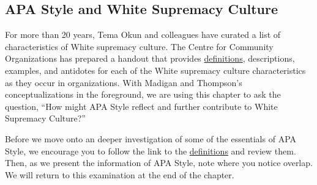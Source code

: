 \documentclass[
  11pt,
]{book}
\begin{document}
\hypertarget{apa-style-and-white-supremacy-culture}{%
\subsection{APA Style and White Supremacy Culture}\label{apa-style-and-white-supremacy-culture}}

For more than 20 years, Tema Okun \citep{noauthor_white_nodate, okun_white_2021} and colleagues have curated a list of characteristics of White supremacy culture. The Centre for Community Organizations has prepared a handout that provides \href{https://coco-net.org/wp-content/uploads/2019/11/Coco-WhiteSupCulture-ENG4.pdf}{definitions}, descriptions, examples, and antidotes for each of the White supremacy culture characteristics as they occur in organizations. With Madigan \citeyearpar{madigan_language_1995} and Thompson's \citeyearpar{thompson_gentlemanly_2004} conceptualizations in the foreground, we are using this chapter to ask the question, ``How might APA Style reflect and further contribute to White Supremacy Culture?''

Before we move onto an deeper investigation of some of the essentials of APA Style, we encourage you to follow the link to the \href{https://coco-net.org/wp-content/uploads/2019/11/Coco-WhiteSupCulture-ENG4.pdf}{definitions} and review them. Then, as we present the information of APA Style, note where you notice overlap. We will return to this examination at the end of the chapter.
\end{document}
